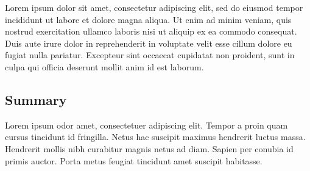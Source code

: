 \documentclass[10pt,twocolumn,letterpaper]{article}
\begin{document}
Lorem ipsum dolor sit amet, consectetur adipiscing elit, sed do eiusmod tempor
incididunt ut labore et dolore magna aliqua. Ut enim ad minim veniam, quis
nostrud exercitation ullamco laboris nisi ut aliquip ex ea commodo consequat.
Duis aute irure dolor in reprehenderit in voluptate velit esse cillum dolore eu
fugiat nulla pariatur. Excepteur sint occaecat cupidatat non proident, sunt in
culpa qui officia deserunt mollit anim id est laborum.


\subsection{Summary}

Lorem ipsum odor amet, consectetuer adipiscing elit. Tempor a proin quam cursus
tincidunt id fringilla. Netus hac suscipit maximus hendrerit luctus massa.
Hendrerit mollis nibh curabitur magnis netus ad diam. Sapien per conubia id
primis auctor. Porta metus feugiat tincidunt amet suscipit habitasse.


    {\small
        
        
    }
\end{document}
